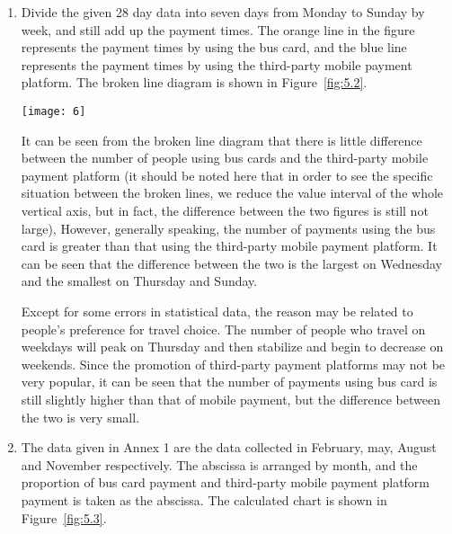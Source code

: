 \documentclass[../mcmpaper]{subfiles}
\begin{document}
\begin{enumerate}[label=\arabic*., format=\bfseries, itemindent=0pt, leftmargin=0pt, topsep=0pt, listparindent=\parindent, itemsep=1pt]
    \item Divide the given 28 day data into seven days from Monday to Sunday by week, and still add up the payment times. The orange line in the figure represents the payment times by using the bus card, and the blue line represents the payment times by using the third-party mobile payment platform. The broken line diagram is shown in Figure~\ref{fig:5.2}.\\
\begin{minipage}{1\linewidth}
\centering
\texttt{[image: 6]}
\label{fig:5.2}
\end{minipage}
\par
It can be seen from the broken line diagram that there is little difference between the number of people using bus cards and the third-party mobile payment platform (it should be noted here that in order to see the specific situation between the broken lines, we reduce the value interval of the whole vertical axis, but in fact, the difference between the two figures is still not large), However, generally speaking, the number of payments using the bus card is greater than that using the third-party mobile payment platform. It can be seen that the difference between the two is the largest on Wednesday and the smallest on Thursday and Sunday.
\par
Except for some errors in statistical data, the reason may be related to people's preference for travel choice. The number of people who travel on weekdays will peak on Thursday and then stabilize and begin to decrease on weekends. Since the promotion of third-party payment platforms may not be very popular, it can be seen that the number of payments using bus card is still slightly higher than that of mobile payment, but the difference between the two is very small.
    \item The data given in Annex 1 are the data collected in February, may, August and November respectively. The abscissa is arranged by month, and the proportion of bus card payment and third-party mobile payment platform payment is taken as the abscissa. The calculated chart is shown in Figure~\ref{fig:5.3}.\\

\end{enumerate}
\end{document}
